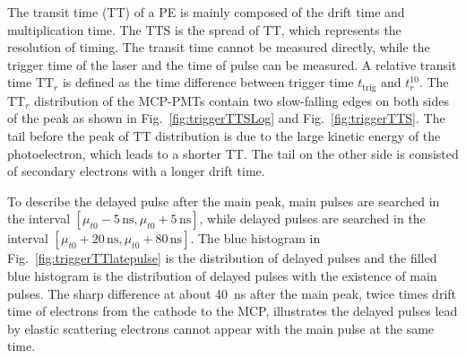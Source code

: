 The transit time (TT) of a PE is mainly composed of the drift time and multiplication time. The TTS is the spread of TT, which represents the resolution of timing. The transit time cannot be measured directly, while the trigger time of the laser and the time of pulse can be measured. A relative transit time $\mathrm{TT}_r$ is defined as the time difference between trigger time $t_{\mathrm{trig}}$ and $t_r^{10}$. The $\mathrm{TT}_r$ distribution of the MCP-PMTs contain two slow-falling edges on both sides of the peak as shown in Fig.~\ref{fig:triggerTTSLog} and Fig.~\ref{fig:triggerTTS}. The tail before the peak of TT distribution is due to the large kinetic energy of the photoelectron, which leads to a shorter TT. The tail on the other side is consisted of secondary electrons with a longer drift time.

To describe the delayed pulse after the main peak, main pulses are searched in the interval $[\mu_{t0}-5\,\mathrm{ns},\mu_{t0}+5\,\mathrm{ns}]$, while delayed pulses are searched in the interval $[\mu_{t0}+20\,\mathrm{ns},\mu_{t0}+80\,\mathrm{ns}]$. The blue histogram in Fig.~\ref{fig:triggerTTlatepulse} is the distribution of delayed pulses and the filled blue histogram is the distribution of delayed pulses with the existence of main pulses. The sharp difference at about \SI{40}{ns} after the main peak, twice times drift time of electrons from the cathode to the MCP, illustrates the delayed pulses lead by elastic scattering electrons cannot appear with the main pulse at the same time.

